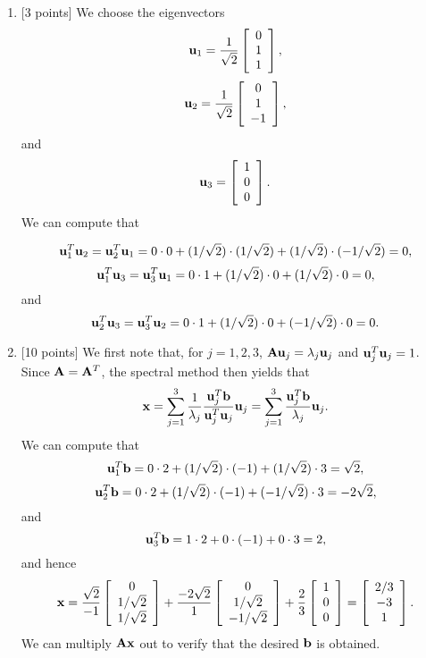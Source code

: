 \begin{solution}
\begin{enumerate}
\item {[3 points]} We choose the eigenvectors
\[ {\bf u}_1 = {1\over \sqrt{2}} \left[\begin{array}{c}0 \\ 1 \\ 1\end{array}\right],\]
\[ {\bf u}_2 = {1\over \sqrt{2}} \left[\begin{array}{c}0 \\ 1 \\ -1\end{array}\right],\]
and
\[ {\bf u}_3 = \left[\begin{array}{c}1 \\ 0 \\ 0\end{array}\right].\]
We can compute that

      \[ {\bf u}_1^T {\bf u}_2 = {\bf u}_2^T{\bf u}_1 = 0\cdot0 + (1/\sqrt{2})\cdot (1/\sqrt{2}) + (1/\sqrt{2})\cdot (-1/\sqrt{2}) = 0,\]
      \[ {\bf u}_1^T {\bf u}_3 = {\bf u}_3^T{\bf u}_1 = 0\cdot1 + (1/\sqrt{2})\cdot 0 + (1/\sqrt{2})\cdot 0 = 0,\]
and
      \[ {\bf u}_2^T {\bf u}_3 = {\bf u}_3^T{\bf u}_2 = 0\cdot1 + (1/\sqrt{2})\cdot 0 + (-1/\sqrt{2})\cdot 0 = 0.\]

\item {[10 points]} We first note that, for $j=1,2,3$, ${\bf A}{\bf u}_j=\lambda_j{\bf u}_j$ and ${\bf u}_j^T {\bf u}_j=1$. Since ${\bf A}={\bf A}^T$, the spectral method then yields that
         \[ {\bf x} = \sum_{j=1}^3 {1 \over \lambda_j} {{\bf u}_j^T{\bf b} \over {\bf u}_j^T {\bf u}_j} {\bf u}_j = \sum_{j=1}^3 {{\bf u}_j^T{\bf b} \over \lambda_j} {\bf u}_j.\]
      We can compute that
          \[ {\bf u}_1^T{\bf b} = 0\cdot 2 + (1/\sqrt{2}) \cdot (-1) + (1/\sqrt{2}) \cdot 3 = \sqrt{2}, \]
          \[ {\bf u}_2^T{\bf b} = 0\cdot 2 + (1/\sqrt{2}) \cdot (-1) + (-1/\sqrt{2}) \cdot 3 = -2\sqrt{2}, \]
and
          \[ {\bf u}_3^T{\bf b} = 1\cdot 2 + 0 \cdot (-1) + 0 \cdot 3 = 2, \]
and hence
\[ {\bf x} =   {\sqrt{2} \over -1} \left[\begin{array}{c} 0 \\ 1/\sqrt{2} \\ 1/\sqrt{2}\end{array}\right]
         + {-2\sqrt{2} \over 1} \left[\begin{array}{c}0 \\ 1/\sqrt{2} \\ -1/\sqrt{2}\end{array}\right]
         + {2 \over 3} \left[\begin{array}{c}1 \\ 0 \\ 0\end{array}\right]
       =   \left[\begin{array}{c}2/3 \\ -3\\ 1\end{array}\right].\]
We can multiply ${\bf A}{\bf x}$ out to verify that the desired ${\bf b}$ is obtained.
\end{enumerate} 
\end{solution}